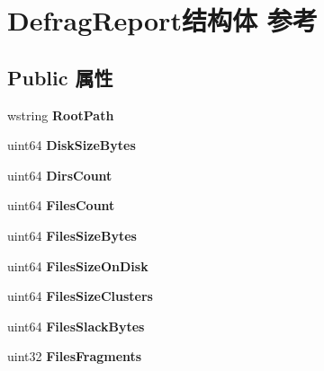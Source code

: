 \hypertarget{struct_defrag_report}{}\section{Defrag\+Report结构体 参考}
\label{struct_defrag_report}
\subsection*{Public 属性}
\begin{DoxyCompactItemize}
\item 
\mbox{\label{struct_defrag_report_a936581f55c6c980daf172787157d15e9}} 
wstring {\bfseries Root\+Path}
\item 
\mbox{\label{struct_defrag_report_affa87e2ee6dae3b41ad3d15407e32a7c}} 
uint64 {\bfseries Disk\+Size\+Bytes}
\item 
\mbox{\label{struct_defrag_report_ad2b3c02371f1d9e93975ae49a4a7c192}} 
uint64 {\bfseries Dirs\+Count}
\item 
\mbox{\label{struct_defrag_report_a80ac01c119ede47f1e305fc9b68b846b}} 
uint64 {\bfseries Files\+Count}
\item 
\mbox{\label{struct_defrag_report_ac9824c4f6bd8ec35c8d4aeff90fe3bff}} 
uint64 {\bfseries Files\+Size\+Bytes}
\item 
\mbox{\label{struct_defrag_report_a18df6eac81b54ed996d80cf9b11eb6a6}} 
uint64 {\bfseries Files\+Size\+On\+Disk}
\item 
\mbox{\label{struct_defrag_report_a1ece80ac3e36a1633345bb1fde6f1958}} 
uint64 {\bfseries Files\+Size\+Clusters}
\item 
\mbox{\label{struct_defrag_report_a778548dd9b62de176bbb65ce4146c4b1}} 
uint64 {\bfseries Files\+Slack\+Bytes}
\item 
\mbox{\label{struct_defrag_report_a41d38175d71923609528c3d406b7af94}} 
uint32 {\bfseries Files\+Fragments}
\item 

\end{DoxyCompactItemize}
